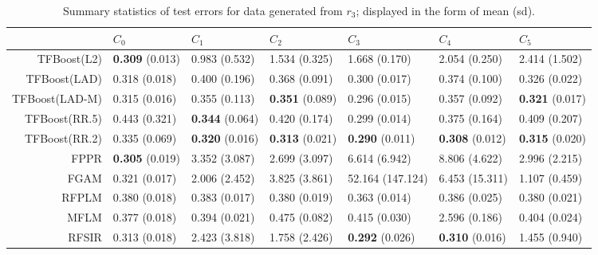\begin{table}[H]
\centering
\footnotesize
\begin{tabular}{rllllll}
  \hline
 & $C_0$ & $C_1$ & $C_2$ & $C_3$ & $C_4$ & $C_5$ \\ 
  \hline
TFBoost(L2) & \textbf{0.309} (0.013) & 0.983 (0.532) & 1.534 (0.325) & 1.668 (0.170) & 2.054 (0.250) & 2.414 (1.502) \\ 
  TFBoost(LAD) & 0.318 (0.018) & 0.400 (0.196) & 0.368 (0.091) & 0.300 (0.017) & 0.374 (0.100) & 0.326 (0.022) \\ 
  TFBoost(LAD-M) & 0.315 (0.016) & 0.355 (0.113) & \textbf{0.351} (0.089) & 0.296 (0.015) & 0.357 (0.092) & \textbf{0.321} (0.017) \\ 
  TFBoost(RR.5) & 0.443 (0.321) & \textbf{0.344} (0.064) & 0.420 (0.174) & 0.299 (0.014) & 0.375 (0.164) & 0.409 (0.207) \\ 
  TFBoost(RR.2) & 0.335 (0.069) & \textbf{0.320} (0.016) & \textbf{0.313} (0.021) & \textbf{0.290} (0.011) & \textbf{0.308} (0.012) & \textbf{0.315} (0.020) \\ 
  FPPR & \textbf{0.305} (0.019) & 3.352 (3.087) & 2.699 (3.097) & 6.614 (6.942) & 8.806 (4.622) & 2.996 (2.215) \\ 
  FGAM & 0.321 (0.017) & 2.006 (2.452) & 3.825 (3.861) & 52.164 (147.124) & 6.453 (15.311) & 1.107 (0.459) \\ 
  RFPLM & 0.380 (0.018) & 0.383 (0.017) & 0.380 (0.019) & 0.363 (0.014) & 0.386 (0.025) & 0.380 (0.021) \\ 
  MFLM & 0.377 (0.018) & 0.394 (0.021) & 0.475 (0.082) & 0.415 (0.030) & 2.596 (0.186) & 0.404 (0.024) \\ 
  RFSIR & 0.313 (0.018) & 2.423 (3.818) & 1.758 (2.426) & \textbf{0.292} (0.026) & \textbf{0.310} (0.016) & 1.455 (0.940) \\ 
   \hline
\end{tabular}
\caption{Summary statistics of test errors for data generated from $r_3$; displayed in the form of mean (sd).} 
\end{table}
